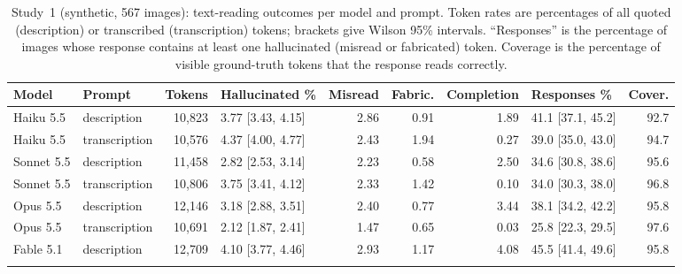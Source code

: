 \documentclass[pdflatex,sn-mathphys-num]{sn-jnl}%
\theoremstyle{thmstyleone}%
\theoremstyle{thmstyletwo}%
\theoremstyle{thmstylethree}%
\newcommand{\NImages}{567}
\begin{document}
\begin{table}[!tbp]
\caption{Study~1 (synthetic, \NImages{} images): text-reading outcomes per model and prompt. Token rates are percentages of all quoted (description) or transcribed (transcription) tokens; brackets give Wilson 95\% intervals. ``Responses'' is the percentage of images whose response contains at least one hallucinated (misread or fabricated) token. Coverage is the percentage of visible ground-truth tokens that the response reads correctly.}\label{tab:rates}
\footnotesize
\setlength{\tabcolsep}{3pt}
\begin{tabular*}{\textwidth}{@{\extracolsep\fill}llrlrrrlr}
\toprule
Model & Prompt & Tokens & Hallucinated \% & Misread & Fabric. & Completion & Responses \% & Cover. \\
\midrule
Haiku 5.5 & description & 10{,}823 & 3.77 [3.43{,} 4.15] & 2.86 & 0.91 & 1.89 & 41.1 [37.1{,} 45.2] & 92.7 \\
Haiku 5.5 & transcription & 10{,}576 & 4.37 [4.00{,} 4.77] & 2.43 & 1.94 & 0.27 & 39.0 [35.0{,} 43.0] & 94.7 \\
Sonnet 5.5 & description & 11{,}458 & 2.82 [2.53{,} 3.14] & 2.23 & 0.58 & 2.50 & 34.6 [30.8{,} 38.6] & 95.6 \\
Sonnet 5.5 & transcription & 10{,}806 & 3.75 [3.41{,} 4.12] & 2.33 & 1.42 & 0.10 & 34.0 [30.3{,} 38.0] & 96.8 \\
Opus 5.5 & description & 12{,}146 & 3.18 [2.88{,} 3.51] & 2.40 & 0.77 & 3.44 & 38.1 [34.2{,} 42.2] & 95.8 \\
Opus 5.5 & transcription & 10{,}691 & 2.12 [1.87{,} 2.41] & 1.47 & 0.65 & 0.03 & 25.8 [22.3{,} 29.5] & 97.6 \\
Fable 5.1 & description & 12{,}709 & 4.10 [3.77{,} 4.46] & 2.93 & 1.17 & 4.08 & 45.5 [41.4{,} 49.6] & 95.8 \\
\botrule
\end{tabular*}
\end{table}
\end{document}
